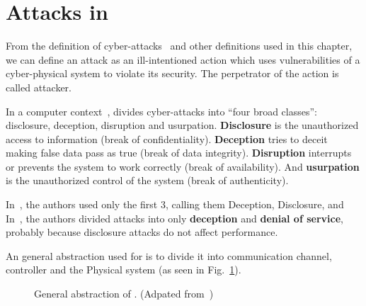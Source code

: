 \documentclass[../main.tex]{subfiles}
\begin{document}
\section{Attacks in \cps{}}\label{sec:attacks}

From the definition of cyber-attacks~\cite{Bishop2005} and other
definitions used in this chapter, we can define an attack as an ill-intentioned action which uses vulnerabilities of a cyber-physical system to violate its security.
The perpetrator of the action is called attacker.

In a computer context~\cite{Bishop2005},  divides cyber-attacks into ``four broad classes'':
disclosure, deception, disruption and usurpation.
\textbf{Disclosure} is the unauthorized access to information (break of confidentiality).
\textbf{Deception} tries to deceit making false data pass as true (break of data integrity).
\textbf{Disruption} interrupts or prevents the system to work correctly (break of availability). And \textbf{usurpation} is the unauthorized control of the system (break of authenticity).

In~\cite{CardenasEtAl2008}, the authors used only the first 3, calling them Deception, Disclosure, and~\DoS{}
In~\cite{AminEtAl2009}, the authors divided attacks into only \textbf{deception} and \textbf{denial of service}, probably because disclosure attacks do not affect performance.

An general abstraction used for \cps{} is to divide it into communication channel, controller and the Physical system (as seen in Fig.~\ref{fig:cps_abstraction}).

\begin{figure}
  \centering
\caption{General abstraction of \cps{}. (Adpated from~\cite{CardenasEtAl2008,AminEtAl2009})}\label{fig:cps_abstraction}
\end{figure}
\end{document}
